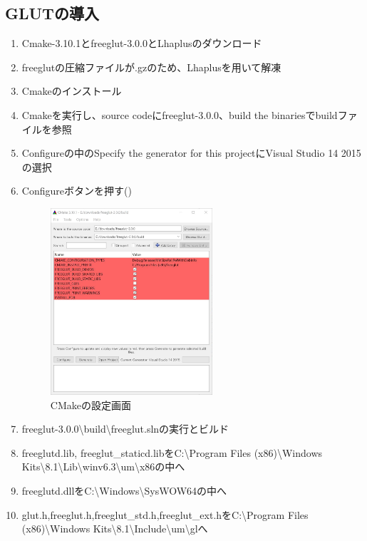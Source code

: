 \documentclass{jsarticle}
\begin{document}
\subsection{GLUTの導入}
\begin{enumerate}
  \item Cmake-3.10.1とfreeglut-3.0.0とLhaplusのダウンロード
  \item freeglutの圧縮ファイルが.gzのため、Lhaplusを用いて解凍
  \item Cmakeのインストール
  \item Cmakeを実行し、source codeにfreeglut-3.0.0、build the binariesでbuildファイルを参照
  \item Configureの中のSpecify the generator for this projectにVisual Studio 14 2015の選択
  \item Configureボタンを押す()

  \begin{figure}[htbp]
    \centering
    \includegraphics[width=6cm]{Cmake.jpg}
    \caption{CMakeの設定画面}
  \end{figure}

  \item freeglut-3.0.0\textbackslash build\textbackslash freeglut.slnの実行とビルド
  \item freeglutd.lib, freeglut\_staticd.libをC:\textbackslash Program Files (x86)\textbackslash Windows Kits\textbackslash 8.1\textbackslash Lib\textbackslash winv6.3\textbackslash um\textbackslash x86の中へ
  \item freeglutd.dllをC:\textbackslash Windows\textbackslash SysWOW64の中へ
  \item glut.h,freeglut.h,freeglut\_std.h,freeglut\_ext.hをC:\textbackslash Program Files (x86)\textbackslash Windows Kits\textbackslash 8.1\textbackslash Include\textbackslash um\textbackslash glへ
\end{enumerate}
\end{document}
